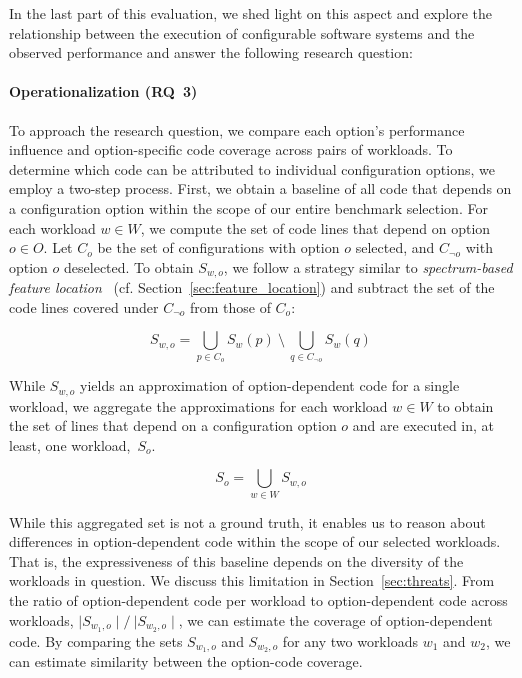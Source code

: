{In the last part of this evaluation, we shed light on this aspect and explore the relationship between the execution of configurable software systems and the observed performance and answer the following research question:



\paragraph*{Operationalization (RQ~3)}
To approach the research question, we compare each option's performance influence and option-specific code coverage across pairs of workloads. 
To determine which code can be attributed to individual configuration options, we employ a two-step process. First, we obtain a baseline of all code that depends on a configuration option within the scope of our entire benchmark selection. For each workload $w \in W$, we compute the set of code lines that depend on option $o \in O$. Let $C_{o}$ be the set of configurations with option $o$ selected, and $C_{\neg o}$ with option $o$ deselected. To obtain $S_{w, o}$, we follow a strategy similar to \textit{spectrum-based feature location}~\cite{michelon_spectrum_2021} (cf. Section~\ref{sec:feature_location}) and subtract the set of the code lines covered under $C_{\neg o}$ from those of $C_{o}$:

\begin{equation}%
	S_{w, o} = \bigcup_{p \in C_{o}} S_{w}(p) ~ \setminus ~ \bigcup_{q \in C_{\neg o}} S_{w}(q)
\end{equation}

While $S_{w, o}$ yields an approximation of option-dependent code for a single workload, we aggregate the approximations for each workload $w \in W$ to obtain the set of lines that depend on a configuration option $o$ and are executed in, at least, one workload,~$S_{o}$. 

\begin{equation}
	S_{o} = \bigcup_{w \in W} S_{w, o}
\end{equation}

While this aggregated set is not a ground truth, it enables us to reason about differences in option-dependent code within the scope of our selected workloads. That is, the expressiveness of this baseline depends on the diversity of the workloads in question. We discuss this limitation in Section~\ref{sec:threats}. From the ratio of option-dependent code per workload to option-dependent code across workloads, $\mid S_{w_1, o}\mid/~{\mid S_{w_2, o}\mid}$, we can estimate the coverage of option-dependent code. By comparing the sets $S_{w_1, o}$ and $S_{w_2, o}$ for any two workloads $w_1$ and $w_2$, we can estimate similarity between the option-code coverage.

}
